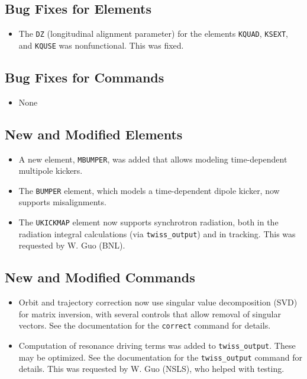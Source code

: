 \documentclass[11pt]{article}
\begin{document}
\subsection{Bug Fixes for Elements}
\begin{itemize}
\item The {\tt DZ} (longitudinal alignment parameter) for the elements {\tt KQUAD}, {\tt KSEXT}, and
  {\tt KQUSE} was nonfunctional. This was fixed.
\end{itemize}

\subsection{Bug Fixes for Commands}
\begin{itemize}
\item None
\end{itemize}

\subsection{New and Modified Elements}
\begin{itemize}
\item A new element, {\tt MBUMPER}, was added that allows modeling time-dependent multipole kickers.
\item The {\tt BUMPER} element, which models a time-dependent dipole kicker, now supports misalignments.
\item The {\tt UKICKMAP} element now supports synchrotron radiation, both in the radiation integral
 calculations (via \verb|twiss_output|) and in tracking.  This was requested by W. Guo (BNL).
\end{itemize}

\subsection{New and Modified Commands}
\begin{itemize}
\item Orbit and trajectory correction now use singular value decomposition (SVD) for matrix inversion,
 with several controls that allow removal of singular vectors.  See the documentation for the 
 \verb|correct| command for details.
\item Computation of resonance driving terms\cite{Bengtsson} was added to \verb|twiss_output|.  These may be optimized.
 See the documentation for the \verb|twiss_output| command for details.
 This was requested by W. Guo (NSLS), who helped with testing.
\end{itemize}
\end{document}
